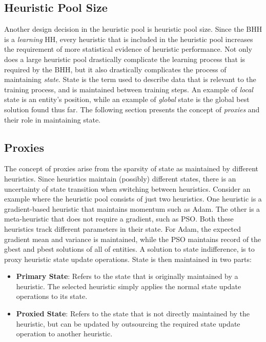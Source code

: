 \subsection{Heuristic Pool Size}\label{sec:bhh:heuristic_pool:pool_size}

Another design decision in the heuristic pool is heuristic pool size. Since the \acs{BHH} is a \textit{learning} \acs{HH}, every heuristic that is included in the heuristic pool increases the requirement of more statistical evidence of heuristic performance. Not only does a large heuristic pool drastically complicate the learning process that is required by the \acs{BHH}, but it also drastically complicates the process of maintaining \textit{state}. State is the term used to describe data that is relevant to the training process, and is maintained between training steps. An example of \textit{local} state is an entity's position, while an example of \textit{global} state is the global best solution found thus far. The following section presents the concept of \textit{proxies} and their role in maintaining state.

\subsection{Proxies}\label{sec:bhh:heuristic:proxies}

The concept of proxies arise from the sparsity of state as maintained by different heuristics. Since heuristics maintain (possibly) different states, there is an uncertainty of state transition when switching between heuristics. Consider an example where the heuristic pool consists of just two heuristics. One heuristic is a gradient-based heuristic that maintains momentum such as \acs{Adam}. The other is a meta-heuristic that does not require a gradient, such as \acs{PSO}. Both these heuristics track different parameters in their state. For \acs{Adam}, the expected gradient mean and variance is maintained, while the \ac{PSO} maintains record of the gbest and pbest solutions of all of entities. A solution to state indifference, is to proxy heuristic state update operations. State is then maintained in two parts:

\begin{itemize}
      \item \textbf{Primary State}: Refers to the state that is originally maintained by a heuristic. The selected heuristic simply applies the normal state update operations to its state.

      \item \textbf{Proxied State}: Refers to the state that is not directly maintained by the heuristic, but can be updated by outsourcing the required state update operation to another heuristic.
\end{itemize}

